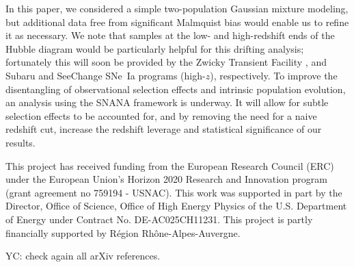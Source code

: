 \documentclass[]{aa}
\newcommand{\nn}[1]{\textcolor[rgb]{0.4, 0.8, 0}{#1}}
\newcommand{\yc}[1]{\textcolor[RGB]{217, 22, 102}{#1}}
\begin{document}
In this paper, we considered a simple two-population Gaussian mixture modeling,
but additional data free from significant Malmquist bias would enable us to
refine it as necessary. We note that samples at the low- and high-redshift ends
of the Hubble diagram would be particularly helpful for this drifting analysis;
fortunately this will soon be provided by the Zwicky Transient Facility
\citep[low-$z$,][]{bellm2019, graham2019}, and Subaru and SeeChange SNe~Ia
programs (high-$z$), respectively. \nn{To improve the disentangling of
observational} selection effects and \nn{intrinsic} population evolution, an
analysis using the SNANA framework is underway. It will allow for subtle
selection effects to be \nn{accounted for}, and by removing the need for a
\nn{naive} redshift cut, increase the redshift leverage and statistical
significance of our results.

\begin{acknowledgements}
    This project has received funding from the European Research Council (ERC)
    under the European Union's Horizon 2020 Research and Innovation program
    (grant agreement no 759194 - USNAC).
    This work was supported in part by the Director, Office of Science, Office
    of High Energy Physics of the U.S. Department of Energy under Contract No.
    DE-AC025CH11231.
    This project is partly financially supported by Région Rhône-Alpes-Auvergne.
\end{acknowledgements}

\yc{YC: check again all arXiv references.}
\end{document}
